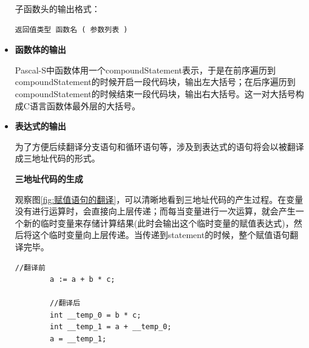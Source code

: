\documentclass[../main.tex]{subfiles}
\begin{document}
\begin{itemize}
    子函数头的输出格式：
    \begin{lstlisting}[style = c]
        返回值类型 函数名 ( 参数列表 )
    \end{lstlisting}
    
    \item \textbf{函数体的输出}
    
    Pascal-S中函数体用一个compoundStatement表示，于是在前序遍历到compoundStatement的时候开启一段代码块，输出左大括号；在后序遍历到compoundStatement的时候结束一段代码块，输出右大括号。这一对大括号构成C语言函数体最外层的大括号。

    \item \textbf{表达式的输出}
    
    为了方便后续翻译分支语句和循环语句等，涉及到表达式的语句将会以被翻译成三地址代码的形式。

    \textbf{三地址代码的生成}
    
    观察图\ref{fig:赋值语句的翻译}，可以清晰地看到三地址代码的产生过程。在变量没有进行运算时，会直接向上层传递；而每当变量进行一次运算，就会产生一个新的临时变量来存储计算结果(此时会输出这个临时变量的赋值表达式)，然后将这个临时变量向上层传递。当传递到statement的时候，整个赋值语句翻译完毕。

    \begin{lstlisting}[style = c]
        //翻译前 
        a := a + b * c;

        //翻译后
        int __temp_0 = b * c;
        int __temp_1 = a + __temp_0;
        a = __temp_1;
    \end{lstlisting}
    

\end{itemize}
\end{document}
